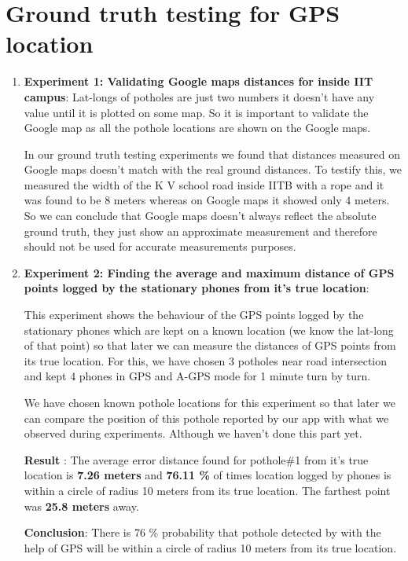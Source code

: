 \documentclass[12pt]{report}
\begin{document}
\section{Ground truth testing for GPS location}
\begin{enumerate}
\item \textbf{Experiment 1: Validating Google maps distances for inside IIT
    campus}: Lat-longs of potholes are just two numbers it doesn't have any value
  until it is plotted on some map. So it is important to validate the Google
  map as all the pothole locations are shown on the Google maps.

  In our ground truth testing experiments we found that distances
  measured on Google maps doesn't match with the real ground distances. To
  testify this, we measured the width of the K V school road inside IITB with a
  rope and it was found to be 8 meters whereas on Google maps it showed only 4
  meters. So we can conclude that Google maps doesn't always reflect the
  absolute ground truth, they just show an approximate measurement and therefore
  should not be used for accurate measurements purposes.

\item \textbf{Experiment 2: Finding the average and maximum distance of GPS
    points logged by the stationary phones from it's true location}: 

  This experiment shows the behaviour of the GPS points logged by the stationary
  phones which are kept on a known location (we know the lat-long of that point)
  so that later we can measure the distances of GPS points from its true
  location. For this, we have chosen 3 potholes near road intersection and kept
  4 phones in GPS and A-GPS mode for 1 minute turn by turn.

  We have chosen known pothole locations for this experiment so that later we
  can compare the position of this pothole reported by our app with what we
  observed during experiments. Although we haven't done this part yet.

  \textbf{Result} : The average error distance found for pothole\#1 from it's
  true location is \textbf{7.26 meters} and \textbf{76.11 \%} of times location
  logged by phones is within a circle of radius 10 meters from its true
  location. The farthest point was \textbf{25.8 meters} away.

  \textbf{Conclusion}: There is 76 \% probability that pothole detected by with
  the help of GPS will be within a circle of radius 10 meters from its true
  location.



\end{enumerate}
\end{document}
